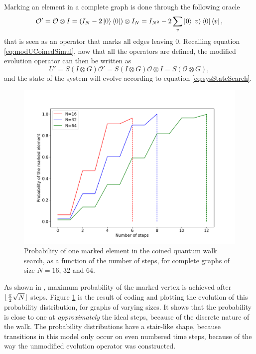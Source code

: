 \documentclass[../../dissertation.tex]{subfiles}
\begin{document}
Marking an element in a complete graph is done through the following oracle
\begin{equation}
	\mathcal{O'} =\mathcal{O}\otimes I = (I_N - 2\ket{0}\bra{0})\otimes I_N = I_{N^2} - 2 \sum_v \ket{0}\ket{v}\bra{0}\bra{v} ,
\end{equation}
that is seen as an operator that marks all edges leaving $0$. Recalling equation
\eqref{eq:modUCoinedSimul}, now that all the operators are defined, the modified evolution
operator can then be written as
\begin{equation}
	U' = S(I \otimes G)\mathcal{O'} = S(I \otimes G)\mathcal{O} \otimes I = S (\mathcal{O} \otimes G),
	\label{eq:modifiedEvoCoined}
\end{equation}
and the state of the system will evolve according to equation \eqref{eq:sysStateSearch}.
\begin{figure}[!h]
	\centering
	\includegraphics[scale=0.40]{img/CoinedQuantumWalk/Search/CoinedSearch163264.png}
	\caption{Probability of one marked element in the coined quantum walk search, as a function of the number of steps, for complete graphs of size $N=16$, $32$ and $64$.}\label{fig:coinedSearch}
\end{figure}\par

As shown in \cite{REN1}, maximum probability of the marked vertex is
achieved after $\lfloor\frac{\pi}{2}\sqrt{N}\rfloor$ steps. Figure \ref{fig:coinedSearch} is
the result of coding and plotting the evolution of this probability
distribution, for graphs of varying sizes. It shows that the probability is close to one at \textit{approximately} the ideal steps, because of the discrete nature of the walk. The probability distributions have a
stair-like shape, because transitions in this model only occur on even numbered
time steps, because of the way the unmodified evolution
operator was constructed.\par
\end{document}
